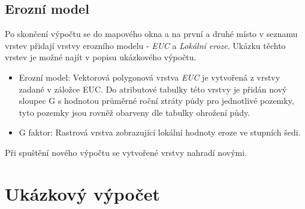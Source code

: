 \subsection{Erozní model} Po skončení výpočtu se do mapového okna a na
první a druhé místo v seznamu vrstev přidají vrstvy erozního modelu -
\textit{EUC} a \textit{Lokální eroze}. Ukázku těchto vrstev je možné
najít v popisu ukázkového výpočtu.
\begin{itemize}
	\item Erozní model: Vektorová polygonová vrstva \textit{EUC}
je vytvořená z vrstvy zadané v záložce EUC. Do atributové tabulky této
vrstvy je přidán nový sloupec G s hodnotou průměrné roční ztráty půdy
pro jednotlivé pozemky, tyto pozemky jsou rovněž obarveny dle tabulky
ohrožení půdy.
	\item G faktor: Rastrová vrstva zobrazující lokální hodnoty
eroze ve stupních šedi.
\end{itemize} Při spuštění nového výpočtu se vytvořené vrstvy nahradí
novými.

\section{Ukázkový výpočet}
